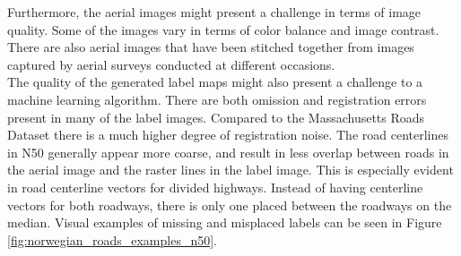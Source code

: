 Furthermore, the aerial images might present a challenge in terms of image quality. Some of the images vary in terms of color balance and image contrast. There are also aerial images that have been stitched together from images captured by aerial surveys conducted at different occasions.\\

The quality of the generated label maps might also present a challenge to a machine learning algorithm. There are both omission and registration errors present in many of the label images. Compared to the Massachusetts Roads Dataset there is a much higher degree of registration noise. The road centerlines in N50 generally appear more coarse, and result in less overlap between roads in the aerial image and the raster lines in the label image. This is especially evident in road centerline vectors for divided highways. Instead of having centerline vectors for both roadways, there is only one placed between the roadways on the median. Visual examples of missing and misplaced labels can be seen in Figure \ref{fig:norwegian_roads_examples_n50}.\\

